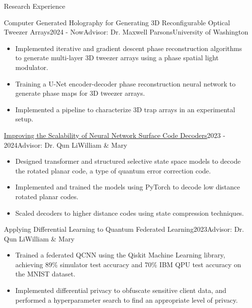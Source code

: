 \begin{rSection}{Research Experience}
\begin{rSubsection}{Computer Generated Holography for Generating 3D Reconfigurable Optical Tweezer Arrays}{2024 - Now}{Advisor: Dr. Maxwell Parsons}{\small University of Washington}
\begin{itemize}
\item Implemented iterative and gradient descent phase reconstruction algorithms to generate multi-layer 3D tweezer arrays using a phase spatial light modulator.
\item Training a U-Net encoder-decoder phase reconstruction neural network to generate phase maps for 3D tweezer arrays.
\item Implemented a pipeline to characterize 3D trap arrays in an experimental setup.
\end{itemize}
\end{rSubsection}

\begin{rSubsection}{\underline{\href{https://scholarworks.wm.edu/honorstheses/2176/}{Improving the Scalability of Neural Network Surface Code Decoders}}}{2023 - 2024}{Advisor: Dr. Qun Li}{\small William \& Mary}
\begin{itemize}
\item Designed transformer and structured selective state space models to decode the rotated planar code, a type of quantum error correction code.
\item Implemented and trained the models using PyTorch to decode low distance rotated planar codes.
\item Scaled decoders to higher distance codes using state compression techniques.
\end{itemize}
\end{rSubsection}

\begin{rSubsection}{Applying Differential Learning to Quantum Federated Learning}{2023}{Advisor: Dr. Qun Li}{\small William \& Mary}
\begin{itemize}
\item Trained a federated QCNN using the Qiskit Machine Learning library, achieving 89\% simulator test accuracy and 70\% IBM QPU test accuracy on the MNIST dataset.
\item Implemented differential privacy to obfuscate sensitive client data, and performed a hyperparameter search to find an appropriate level of privacy. 
\end{itemize}
\end{rSubsection}


\end{rSection}
